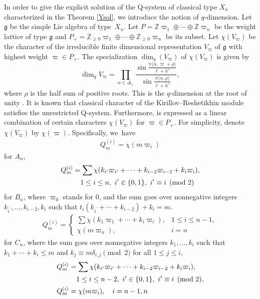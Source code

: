 \documentclass[10pt,a4paper]{amsart}
\numberwithin{equation}{section}
\newcommand{\Z}{{\mathbb Z}}
\newcommand{\geh}{\mathfrak{g}}
\newcommand{\op}{\oplus}
\newcommand{\pair}[1]{\langle{#1}\rangle}
\begin{document}
In order to give the explicit solution of the Q-system of classical type $X_n$ characterized in the Theorem \ref{Ysol}, we introduce the notion of $q$-dimension.
Let $\geh$ be the simple Lie algebra of type~$X_n$.
Let $P=\Z\varpi_1\op\cdots\op\Z\varpi_n$ be the weight lattice of type $\geh$ and $P_+=\Z_{\geq0}\varpi_1\op\cdots\op\Z_{\geq0}\varpi_n$ be its subset.
Let $\chi(V_\varpi)$ be the character of the irreducible finite dimensional representation $V_\varpi$ of $\geh$ with highest weight $\varpi\in P_+$.
The specialization $\dim_q(V_\varpi)$ of $\chi(V_\varpi)$ is given by \[
\dim\nolimits_qV_\varpi=\prod_{\alpha\in\Delta_+}\frac{\sin{\frac{\pi\pair{\alpha,\varpi+\rho}}{\ell+h^\vee}}}{\sin{\frac{\pi\pair{\alpha,\rho}}{\ell+h^\vee}}},
\]
where $\rho$ is the half sum of positive roots.
This is the $q$-dimension at the root of unity .
It is known that classical character of the Kirillov--Reshetikhin module  satisfies the unrestricted Q-system.
Furthermore,  is expressed as a linear combination of certain characters $\chi(V_\varpi)$ for $\varpi\in P_+$.
For simplicity, denote $\chi(V_\varpi)$ by $\chi(\varpi)$.
Specifically, we~have
	\begin{align}\label{QA}
	Q_m^{(i)}=\chi(m\varpi_i)
	\end{align}
for $A_n$,
	\begin{align}
	&Q_m^{(i)}=\sum\chi(k_{i^\prime}\varpi_{i^\prime}+\cdots+k_{i-2}\varpi_{i-2}+k_i\varpi_i),\nonumber\\
 & \hphantom{Q_m^{(i)}=}  1\leq i\leq n,\ i^\prime\in\{0,1\},\ i^\prime\equiv i\pmod{2}\label{QB}
	\end{align}
for $B_n$, where $\varpi_0$ stands for 0, and the sum goes over nonnegative integers $k_{i^\prime},\dots,k_{i-2},k_i$ such that $t_i(k_{i^\prime}+\cdots+k_{i-2})+k_i=m$.
	\begin{align}\label{QC}
	Q_m^{(i)}=\begin{cases}
		\sum\chi(k_1\varpi_1+\cdots+k_i\varpi_i),&1\leq i\leq n-1,\\
		\chi(m\varpi_n),&i=n
	\end{cases}
	\end{align}
for $C_n$, where the sum goes over nonnegative integers $k_1,\dots,k_i$ such that $k_1+\cdots+k_i\leq m$ and $k_j\equiv m\delta_{i,j}\pmod{2}$ for all $1\leq j\leq i$,
	\begin{align}\label{QD}
\begin{aligned}
&Q_m^{(i)}=\sum\chi(k_{i^\prime}\varpi_{i^\prime}+\cdots+k_{i-2}\varpi_{i-2}+k_i\varpi_i),\\
 &\hphantom{Q_m^{(i)}=} 1\leq i\leq n-2,\ i^\prime\in\{0,1\},\ i^\prime\equiv i\pmod{2}, \\
	&Q_m^{(i)}=\chi(m\varpi_i),\quad i=n-1,n
\end{aligned}
	\end{align}
\end{document}
